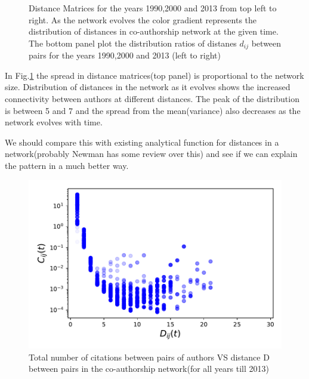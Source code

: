 \documentclass[aps, pre, twocolumn, nofootinbib]{revtex4-1}
\begin{document}
\begin{figure}[htbp]
  \captionsetup{singlelinecheck=false, justification=raggedright,  labelsep=space}
  \caption{Distance Matrices for the years 1990,2000 and 2013 from top left to right. As the network evolves the color gradient represents the distribution of distances in co-authorship network at the given time. The bottom panel plot the distribution ratios of distanes $d_{ij}$ between pairs for the years 1990,2000 and 2013 (left to right)}
  \label{f2}
\end{figure}
In Fig.\ref{f2} the spread in distance matrices(top panel) is proportional to the network size. Distribution of distances in the network as it  evolves shows the increased connectivity between authors at different distances. The peak of the distribution is between 5 and 7 and the spread from the mean(variance) also decreases as the network evolves with time. 

{\color{blue}We should compare this with existing analytical function for distances in a network(probably Newman has some review over this) and see if we can explain the pattern in a much better way.}

\begin{figure}
	\centering
	
	\includegraphics[scale = 0.55]{plots/fig1}
	
\captionsetup{singlelinecheck=false, justification=raggedright,  labelsep=space}
\caption{Total number of citations between pairs of authors VS distance D between pairs in the co-authorship network(for all years till 2013)}
   \label{f3}
\end{figure}
\end{document}
